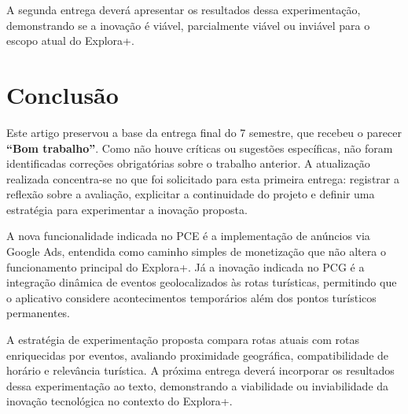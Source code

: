 \documentclass[12pt, a4paper]{article}
\begin{document}
A segunda entrega dever\'a apresentar os resultados dessa experimenta\c{c}\~ao, demonstrando se a inova\c{c}\~ao \'e vi\'avel, parcialmente vi\'avel ou invi\'avel para o escopo atual do Explora+.
\clearpage
\section{Conclus\~ao}

Este artigo preservou a base da entrega final do 7\textordmasculine{} semestre, que recebeu o parecer \textbf{``Bom trabalho''}. Como n\~ao houve cr\'iticas ou sugest\~oes espec\'ificas, n\~ao foram identificadas corre\c{c}\~oes obrigat\'orias sobre o trabalho anterior. A atualiza\c{c}\~ao realizada concentra-se no que foi solicitado para esta primeira entrega: registrar a reflex\~ao sobre a avalia\c{c}\~ao, explicitar a continuidade do projeto e definir uma estrat\'egia para experimentar a inova\c{c}\~ao proposta.

A nova funcionalidade indicada no PCE \'e a implementa\c{c}\~ao de an\'uncios via Google Ads, entendida como caminho simples de monetiza\c{c}\~ao que n\~ao altera o funcionamento principal do Explora+. J\'a a inova\c{c}\~ao indicada no PCG \'e a integra\c{c}\~ao din\^amica de eventos geolocalizados \`as rotas tur\'isticas, permitindo que o aplicativo considere acontecimentos tempor\'arios al\'em dos pontos tur\'isticos permanentes.

A estrat\'egia de experimenta\c{c}\~ao proposta compara rotas atuais com rotas enriquecidas por eventos, avaliando proximidade geogr\'afica, compatibilidade de hor\'ario e relev\^ancia tur\'istica. A pr\'oxima entrega dever\'a incorporar os resultados dessa experimenta\c{c}\~ao ao texto, demonstrando a viabilidade ou inviabilidade da inova\c{c}\~ao tecnol\'ogica no contexto do Explora+.
\clearpage
\printbibliography[title={Refer\^encias}]
\end{document}
